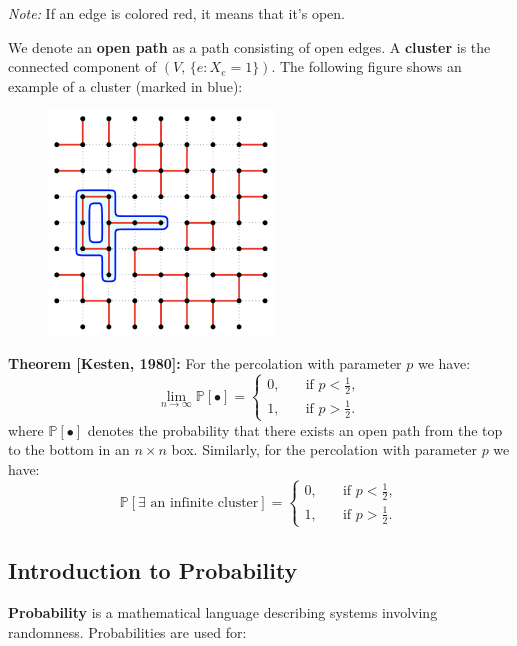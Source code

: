 \documentclass[a4paper]{extarticle}
\begin{document}
\textit{Note:} If an edge is colored red, it means that it's open.

We denote an \textbf{open path} as a path consisting of open edges. A \textbf{cluster} is the connected component of \((V, \, \{e : X_e = 1\})\). The following figure shows an example of a cluster (marked in blue):

\begin{figure}[H]
    \includegraphics[width=6cm]{../images/WuS_Fig1-2}
    \centering
\end{figure}

\begin{tbox}
    \textbf{Theorem [Kesten, 1980]:} For the percolation with parameter \(p\) we have:
    \[
        \lim_{n \to \infty} \mathbb{P} [\bullet] = \begin{cases}
            0, \quad &\text{if } p < \frac{1}{2}, \\ 1, \quad &\text{if } p > \frac{1}{2}.
        \end{cases}
    \]
    where \(\mathbb{P}[\bullet]\) denotes the probability that there exists an open path from the top to the bottom in an \(n \times n\) box.
    Similarly, for the percolation with parameter \(p\) we have:
    \[
        \mathbb{P}[\exists \text{ an infinite cluster}] = \begin{cases}
            0, \quad &\text{if } p < \frac{1}{2}, \\ 1, \quad &\text{if } p > \frac{1}{2}.
        \end{cases}
    \]
\end{tbox}

\subsection{Introduction to Probability}

\textbf{Probability} is a mathematical language describing systems involving randomness. Probabilities are used for:
\end{document}
